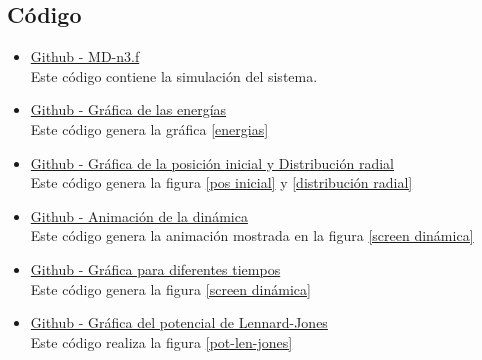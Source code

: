 \documentclass[12pt,letterpaper]{article}
\begin{document}
\begin{multicols}{2}
\section*{Código}
\begin{itemize}
\item \href{https://github.com/giovannilopez9808/Notas_Agosto_2020/blob/master/Simulaciones/Proyecto_1/Scripts/MD-n3.f}{Github - MD-n3.f}\\
Este código contiene la simulación del sistema.
\item \href{https://github.com/giovannilopez9808/Notas_Agosto_2020/blob/master/Simulaciones/Proyecto_1/Scripts/Energy_Graphics.py}{Github - Gráfica de las energías}\\
Este código genera la gráfica \ref{energias}
\item \href{https://github.com/giovannilopez9808/Notas_Agosto_2020/blob/master/Simulaciones/Proyecto_1/Scripts/Cor_Graphics.py}{Github - Gráfica de la posición inicial y Distribución radial}\\
Este código genera la figura \ref{pos inicial} y \ref{distribución radial}
\item \href{https://github.com/giovannilopez9808/Notas_Agosto_2020/blob/master/Simulaciones/Proyecto_1/Scripts/Dim_gif.py}{Github - Animación de la dinámica}\\
Este código genera la animación mostrada en la figura \ref{screen dinámica}
\item \href{https://github.com/giovannilopez9808/Notas_Agosto_2020/blob/master/Simulaciones/Proyecto_1/Scripts/Dim_Graphics.py}{Github - Gráfica para diferentes tiempos}\\
Este código genera la figura \ref{screen dinámica}

\item \href{https://github.com/giovannilopez9808/Notas_Agosto_2020/blob/master/Simulaciones/Proyecto_1/Scripts/Potencial_Graphics.py}{Github - Gráfica del potencial de Lennard-Jones}\\
Este código realiza la figura \ref{pot-len-jones}
\end{itemize}


\nocite{*}
\end{multicols}
\end{document}
